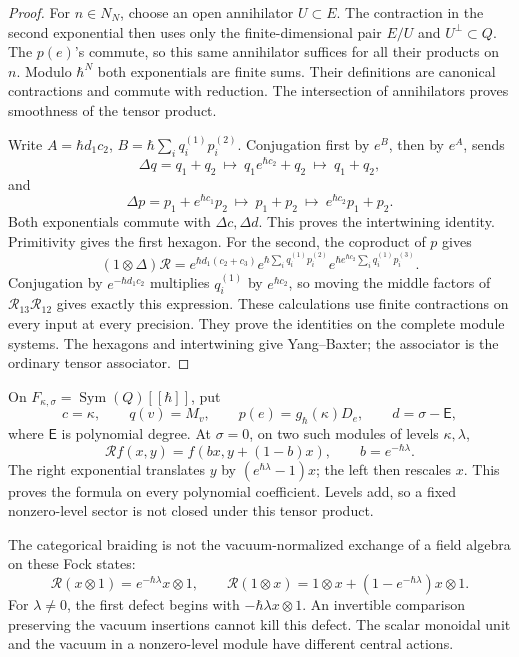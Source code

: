 \begin{proof}
For \(n\in N_N\), choose an open annihilator \(U\subset E\).
The contraction in the second exponential then uses only the
finite-dimensional pair \(E/U\) and \(U^\perp\subset Q\).
The \(p(e)\)'s commute, so this same annihilator suffices for all
their products on \(n\).
Modulo \(\hbar^N\) both exponentials are finite sums.
Their definitions are canonical contractions and commute with
reduction. The intersection of annihilators proves smoothness
of the tensor product.

Write \(A=\hbar d_1c_2\), \(B=\hbar\sum_iq_i^{(1)}p_i^{(2)}\).
Conjugation first by \(e^B\), then by \(e^A\), sends
\[
 \Delta q=q_1+q_2
 \ \longmapsto\ q_1e^{\hbar c_2}+q_2
 \ \longmapsto\ q_1+q_2,
\]
and
\[
 \Delta p=p_1+e^{\hbar c_1}p_2
 \ \longmapsto\ p_1+p_2
 \ \longmapsto\ e^{\hbar c_2}p_1+p_2.
\]
Both exponentials commute with \(\Delta c,\Delta d\).
This proves the intertwining identity.
Primitivity gives the first hexagon.
For the second, the coproduct of \(p\) gives
\[
 (1\otimes\Delta)\mathcal R
 =e^{\hbar d_1(c_2+c_3)}
  e^{\hbar\sum_iq_i^{(1)}p_i^{(2)}}
  e^{\hbar e^{\hbar c_2}\sum_iq_i^{(1)}p_i^{(3)}}.
\]
Conjugation by \(e^{-\hbar d_1c_2}\) multiplies \(q_i^{(1)}\)
by \(e^{\hbar c_2}\), so moving the middle factors of
\(\mathcal R_{13}\mathcal R_{12}\) gives exactly this expression.
These calculations use finite contractions on every input at
every precision. They prove the identities on the complete
module systems. The hexagons and intertwining give Yang--Baxter;
the associator is the ordinary tensor associator.
\end{proof}

On \(F_{\kappa,\sigma}=\operatorname{Sym}(Q)[[\hbar]]\), put
\[
 c=\kappa,\qquad q(v)=M_v,\qquad
 p(e)=g_\hbar(\kappa)D_e,\qquad d=\sigma-\mathsf E,
\]
where \(\mathsf E\) is polynomial degree.
At \(\sigma=0\), on two such modules of levels \(\kappa,\lambda\),
\begin{equation}\label{cyrep:eq:oscillator-shear}
 \mathcal R f(x,y)=f(bx,y+(1-b)x),\qquad b=e^{-\hbar\lambda}.
\end{equation}
The right exponential translates \(y\) by
\((e^{\hbar\lambda}-1)x\); the left then rescales \(x\).
This proves the formula on every polynomial coefficient.
Levels add, so a fixed nonzero-level sector is not closed under
this tensor product.

The categorical braiding is not the vacuum-normalized exchange
of a field algebra on these Fock states:
\[
 \mathcal R(x\otimes1)=e^{-\hbar\lambda}x\otimes1,\qquad
 \mathcal R(1\otimes x)
       =1\otimes x+(1-e^{-\hbar\lambda})x\otimes1.
\]
For \(\lambda\ne0\), the first defect begins with
\(-\hbar\lambda x\otimes1\).
An invertible comparison preserving the vacuum insertions
cannot kill this defect. The scalar monoidal unit and the
vacuum in a nonzero-level module have different central actions.

